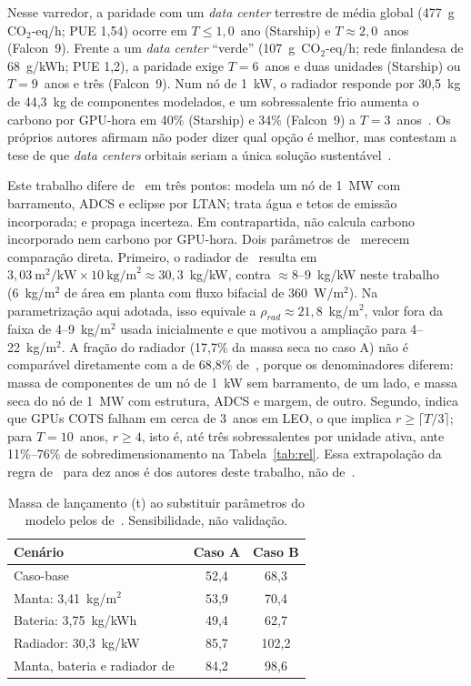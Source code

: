 \documentclass[11pt,a4paper]{article}
\newcommand{\COeq}{\ensuremath{\mathrm{CO_2}\text{-eq}}}
\begin{document}
Nesse varredor, a paridade com um \emph{data center} terrestre de média global
(477~g~$\COeq$/h; PUE 1,54) ocorre em $T\le1{,}0$~ano (Starship) e
$T\approx2{,}0$~anos (Falcon~9). Frente a um \emph{data center} ``verde''
(107~g~$\COeq$/h; rede finlandesa de 68~g/kWh; PUE 1,2), a paridade exige
$T=6$~anos e duas unidades (Starship) ou $T=9$~anos e três (Falcon~9). Num nó
de 1~kW, o radiador responde por 30,5~kg de 44,3~kg de componentes modelados, e
um sobressalente frio aumenta o carbono por GPU-hora em 40\% (Starship) e 34\%
(Falcon~9) a $T=3$~anos~\cite{r19}. Os próprios autores afirmam não poder dizer
qual opção é melhor, mas contestam a tese de que \emph{data centers} orbitais
seriam a única solução sustentável~\cite{r19}.

Este trabalho difere de~\cite{r19} em três pontos: modela um nó de 1~MW com
barramento, ADCS e eclipse por LTAN; trata água e tetos de emissão incorporada;
e propaga incerteza. Em contrapartida, não calcula carbono incorporado nem
carbono por GPU-hora. Dois parâmetros de~\cite{r19} merecem comparação direta.
Primeiro, o radiador de~\cite{r19} resulta em
$3{,}03~\text{m}^2/\text{kW}\times10~\text{kg/m}^2\approx30{,}3$~kg/kW, contra
$\approx8$--$9$~kg/kW neste trabalho (6~kg/m$^2$ de área em planta com fluxo
bifacial de 360~W/m$^2$). Na parametrização aqui adotada, isso equivale a
$\rho_{rad}\approx21{,}8$~kg/m$^2$, valor fora da faixa de 4--9~kg/m$^2$ usada
inicialmente e que motivou a ampliação para 4--22~kg/m$^2$. A fração do
radiador (17,7\% da massa seca no caso A) não é comparável diretamente com a de
68,8\% de~\cite{r19}, porque os denominadores diferem: massa de componentes de
um nó de 1~kW sem barramento, de um lado, e massa seca do nó de 1~MW com
estrutura, ADCS e margem, de outro. Segundo, \cite{r19} indica que GPUs COTS
falham em cerca de 3~anos em LEO, o que implica $r\ge\lceil T/3\rceil$; para
$T=10$~anos, $r\ge4$, isto é, até três sobressalentes por unidade ativa, ante
11\%--76\% de sobredimensionamento na Tabela~\ref{tab:rel}. Essa extrapolação
da regra de~\cite{r19} para dez anos é dos autores deste trabalho, não
de~\cite{r19}.

\begin{table}[ht]
\centering
\caption{Massa de lançamento (t) ao substituir parâmetros do modelo pelos
de~\cite{r19}. Sensibilidade, não validação.}
\label{tab:cal19}
\small
\begin{tabular}{@{}lcc@{}}
\toprule
Cenário & Caso A & Caso B\\
\midrule
Caso-base                                  & 52,4 & 68,3\\
Manta: 3,41~kg/m$^2$                       & 53,9 & 70,4\\
Bateria: 3,75~kg/kWh                       & 49,4 & 62,7\\
Radiador: 30,3~kg/kW                       & 85,7 & 102,2\\
Manta, bateria e radiador de~\cite{r19}    & 84,2 & 98,6\\
\bottomrule
\end{tabular}
\end{table}
\end{document}
